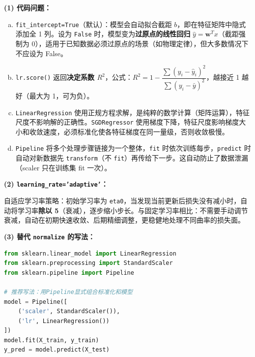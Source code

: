 \documentclass[a4paper,11pt]{ctexart}
\begin{document}
\begin{solutionbox}[参考答案与详细解析]
    \textbf{(1) 代码问题：}
    \begin{enumerate}[a.]
        \item \texttt{fit\_intercept=True}（默认）：模型会自动拟合截距 $b$，即在特征矩阵中隐式添加全 1 列。设为 \texttt{False} 时，模型变为\textbf{过原点的线性回归} $\hat{y}=\boldsymbol{w}^T x$（截距强制为 0），适用于已知数据必须过原点的场景（如物理定律），但大多数情况下不应设为 False。
        \item \texttt{lr.score()} 返回\textbf{决定系数 $R^2$}，公式：$R^2 = 1 - \dfrac{\sum(y_i-\hat{y}_i)^2}{\sum(y_i-\bar{y})^2}$，越接近 1 越好（最大为 1，可为负）。
        \item \texttt{LinearRegression} 使用正规方程求解，是纯粹的数学计算（矩阵运算），特征尺度不影响解的正确性。\texttt{SGDRegressor} 使用梯度下降，特征尺度影响梯度大小和收敛速度，必须标准化使各特征梯度在同一量级，否则收敛极慢。
        \item \texttt{Pipeline} 将多个处理步骤链接为一个整体，\texttt{fit} 时依次训练每步，\texttt{predict} 时自动对新数据先 \texttt{transform}（不 \texttt{fit}）再传给下一步。这自动防止了数据泄漏（scaler 只在训练集 fit 一次）。
    \end{enumerate}

    \textbf{(2) \texttt{learning\_rate='adaptive'}：}

    自适应学习率策略：初始学习率为 \texttt{eta0}，当发现当前更新后损失没有减小时，自动将学习率\textbf{除以 5}（衰减），逐步缩小步长。与固定学习率相比：不需要手动调节衰减，自动在初期快速收敛、后期精细调整，更稳健地处理不同曲率的损失面。

    \textbf{(3) 替代 \texttt{normalize} 的写法：}

    \begin{lstlisting}[language=Python]
from sklearn.linear_model import LinearRegression
from sklearn.preprocessing import StandardScaler
from sklearn.pipeline import Pipeline

# 推荐写法：用Pipeline显式组合标准化和模型
model = Pipeline([
    ('scaler', StandardScaler()),
    ('lr', LinearRegression())
])
model.fit(X_train, y_train)
y_pred = model.predict(X_test)
    \end{lstlisting}
\end{solutionbox}
\end{document}
